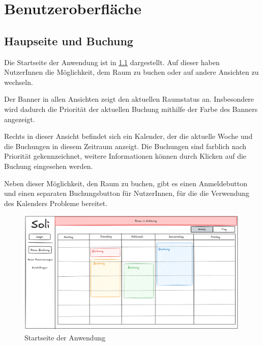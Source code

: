 
\chapter{Benutzeroberfläche}
\label{chap:ui}

\section{Haupseite und Buchung}

Die Startseite der Anwendung ist in \ref{fig:startseite} dargestellt.
Auf dieser haben NutzerInnen die Möglichkeit, dem Raum zu buchen oder auf andere Ansichten zu wechseln.

Der Banner in allen Ansichten zeigt den aktuellen Raumstatus an.
Insbesondere wird dadurch die Priorität der aktuellen Buchung mithilfe der Farbe des Banners angezeigt.

Rechts in dieser Ansicht befindet sich ein Kalender, der die aktuelle Woche und die Buchungen in diesem Zeitraum anzeigt.
Die Buchungen sind farblich nach Priorität gekennzeichnet, weitere Informationen können durch Klicken auf die Buchung eingesehen werden.

Neben dieser Möglichkeit, den Raum zu buchen, gibt es einen Anmeldebutton und einen separaten Buchungsbutton für NutzerInnen,
für die die Verwendung des Kalenders Probleme bereitet.
\begin{figure}[ht]
    \centering
    \includegraphics[scale=0.15]{figures/ui/startseite}
    \caption{Startseite der Anwendung}
    \label{fig:startseite}
\end{figure}
\clearpage

